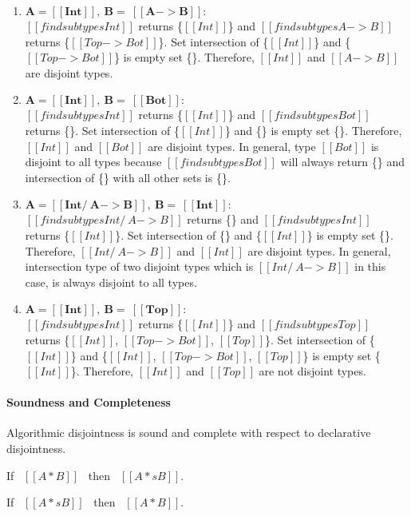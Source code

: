 \begin{enumerate}
  \item $\boldsymbol{A = [[Int]], \ B = \ [[A -> B]]:}$ \\
        $[[findsubtypes Int]]$ returns \{$[[Int]]$\} and $[[findsubtypes A -> B]]$ returns
        \{$[[Top -> Bot]]$\}. Set intersection of \{$[[Int]]$\} and \{$[[Top -> Bot]]$\} is
        empty set \{\}. Therefore, $[[Int]]$ and $[[A -> B]]$ are disjoint types.
  \item $\boldsymbol{A = [[Int]], \ B = \ [[Bot]]:}$ \\
        $[[findsubtypes Int]]$ returns \{$[[Int]]$\} and $[[findsubtypes Bot]]$ returns
        \{\}. Set intersection of \{$[[Int]]$\} and \{\} is
        empty set \{\}. Therefore, $[[Int]]$ and $[[Bot]]$ are disjoint types.
        In general, type $[[Bot]]$ is disjoint to all types because $[[findsubtypes Bot]]$
        will always return \{\} and intersection of \{\} with all other sets is \{\}.
  \item $\boldsymbol{A = [[Int /\ A -> B]], \ B = \ [[Int]]:}$ \\
        $[[findsubtypes Int /\ A -> B]]$ returns \{\} and $[[findsubtypes Int]]$ returns
        \{$[[Int]]$\}. Set intersection of \{\} and \{$[[Int]]$\} is
        empty set \{\}. Therefore, $[[Int /\ A -> B]]$ and $[[Int]]$ are disjoint types.
        In general, intersection type of two disjoint types which is $[[Int /\ A -> B]]$ in this case,
        is always disjoint to all types.
  \item $\boldsymbol{A = [[Int]], \ B = \ [[Top]]:}$ \\
        $[[findsubtypes Int]]$ returns \{$[[Int]]$\} and $[[findsubtypes Top]]$ returns
        \{$[[Int]]$, $[[Top -> Bot]]$, $[[Top]]$\}.
        Set intersection of \{$[[Int]]$\} and \{$[[Int]]$, $[[Top -> Bot]]$, $[[Top]]$\} is
        empty set \{$[[Int]]$\}. Therefore, $[[Int]]$ and $[[Top]]$ are not disjoint types.
\end{enumerate}

\paragraph{Soundness and Completeness}
Algorithmic disjointness is sound and complete with respect to declarative disjointness.

\begin{lemma}
  If \ $[[A * B]]$ \ then \ $[[A *s B]]$.
\label{lemma:inter:disj-sound}
\end{lemma}

\begin{lemma}
  If \ $[[A *s B]]$ \ then \ $[[A * B]]$.
\label{lemma:inter:disj-complete}
\end{lemma}

